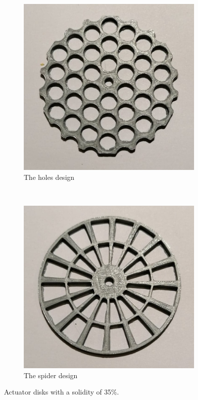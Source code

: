 \begin{figure} [h!]
    \centering
    \begin{subfigure}[b]{0.45\linewidth}
        \includegraphics[width=\textwidth]{0_Images/holes35.jpg}
        \caption{The \gls{holes} design}
        \label{Fig:holes35}
    \end{subfigure}
    ~
    \begin{subfigure}[b]{0.45\linewidth}
        \includegraphics[width=\textwidth]{0_Images/spider35.jpg}
        \caption{The \gls{spider} design}
        \label{Fig:spider35}
    \end{subfigure}
    \caption{Actuator disks with a solidity of 35\%.}
    \label{Fig:35Sol}
\end{figure}

